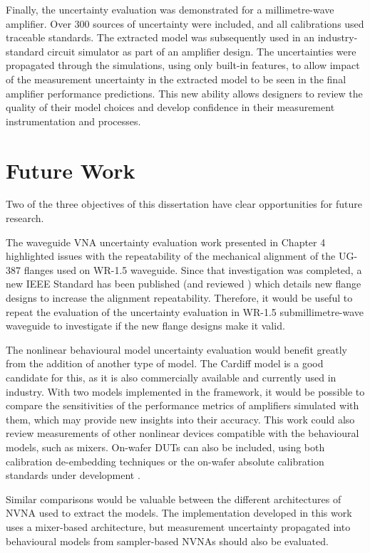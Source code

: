 \documentclass[../thesis/thesis.tex]{subfiles}
\begin{document}
\begin{refsection}
Finally, the uncertainty evaluation was demonstrated for a millimetre-wave amplifier. Over 300 sources of uncertainty were included, and all calibrations used traceable standards. The extracted model was subsequently used in an industry-standard circuit simulator as part of an amplifier design. The uncertainties were propagated through the simulations, using only built-in features, to allow impact of the measurement uncertainty in the extracted model to be seen in the final amplifier performance predictions. This new ability allows designers to review the quality of their model choices and develop confidence in their measurement instrumentation and processes.

\newpage
\section{Future Work}

Two of the three objectives of this dissertation have clear opportunities for future research.

The waveguide VNA uncertainty evaluation work presented in Chapter 4 highlighted issues with the repeatability of the mechanical alignment of the UG-387 flanges used on WR-1.5 waveguide. Since that investigation was completed, a new IEEE Standard has been published (and reviewed \cite{Ridler_2017}) which details new flange designs to increase the alignment repeatability. Therefore, it would be useful to repeat the evaluation of the uncertainty evaluation in WR-1.5 submillimetre-wave waveguide to investigate if the new flange designs make it valid.

The nonlinear behavioural model uncertainty evaluation would benefit greatly from the addition of another type of model. The Cardiff model \cite{Qi_2009} is a good candidate for this, as it is also commercially available and currently used in industry. With two models implemented in the framework, it would be possible to compare the sensitivities of the performance metrics of amplifiers simulated with them, which may provide new insights into their accuracy. This work could also review measurements of other nonlinear devices compatible with the behavioural models, such as mixers. On-wafer DUTs can also be included, using both calibration de-embedding techniques or the on-wafer absolute calibration standards under development \cite{Long_2016}.

Similar comparisons would be valuable between the different architectures of NVNA used to extract the models. The implementation developed in this work uses a mixer-based architecture, but measurement uncertainty propagated into behavioural models from sampler-based NVNAs should also be evaluated.


\end{refsection}
\end{document}

